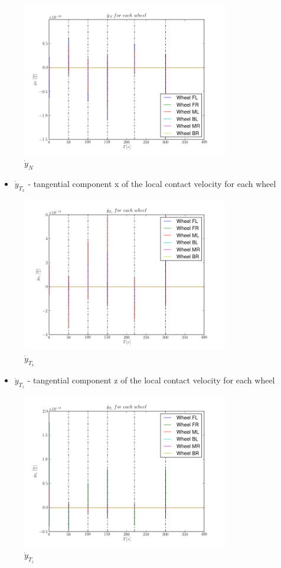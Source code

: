 \begin{figure}[H]
  \centering
    \includegraphics[width=0.8\textwidth]{yNdot3}
  \caption{$\dot{y}_{N}$}
\end{figure}

\begin{itemize}
  \item $\dot{y}_{T_x}$ - tangential component x of the local contact velocity for each wheel
\end{itemize}

\begin{figure}[H]
  \centering
    \includegraphics[width=0.8\textwidth]{yTxdots3}
  \caption{$\dot{y}_{T_x}$}
\end{figure}

\begin{itemize}
  \item $\dot{y}_{T_z}$ - tangential component z of the local contact velocity for each wheel
\end{itemize}

\begin{figure}[H]
  \centering
    \includegraphics[width=0.8\textwidth]{yTzdots3}
  \caption{$\dot{y}_{T_z}$}
\end{figure}
